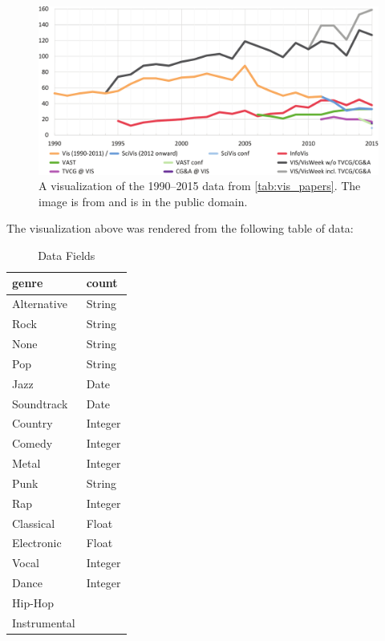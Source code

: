 \documentclass[journal]{vgtc}                %
\begin{document}
\begin{figure}[h]
 \centering %
 \includegraphics[width=\columnwidth]{paper-count-w-2015-new}
 \caption{A visualization of the 1990--2015 data from \autoref{tab:vis_papers}. The image is from \cite{Isenberg:2017:VMC} and is in the public domain.}
 \label{fig:sample}
\end{figure}

The visualization above was rendered from the following table of data:

\begin{table}[h]
  \caption{Data Fields}
  \label{tab:fields}
  \scriptsize%
	\centering%
  \begin{tabu}{l l}
  \toprule
    genre & count \\
  \midrule
  Alternative & String \\
  Rock & String \\
  None & String \\
  Pop & String \\
  Jazz & Date \\
  Soundtrack & Date \\
  Country & Integer \\
  Comedy & Integer \\
  Metal & Integer \\
  Punk & String \\
  Rap & Integer \\
  Classical & Float \\
  Electronic & Float \\
  Vocal & Integer \\
  Dance & Integer \\
  Hip-Hop & \\
  Instrumental & \\
  \midrule
  \end{tabu}%
\end{table}
\end{document}
